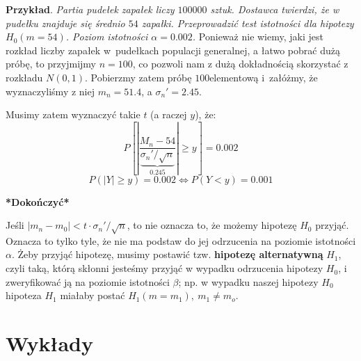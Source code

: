 \documentclass[10pt,a4paper]{article}
\makeatletter
\newcounter{lecture}
\newcommand \listoflectures { \section*{Wykłady} \@starttoc{lol} }
\makeatother
\begin{document}
\textbf{Przykład}. \textit{Partia pudełek zapałek liczy $100000$ sztuk. Dostawca twierdzi, że w pudełku znajduje się średnio $54$ zapałki. Przeprowadzić
 test istotności dla hipotezy $H_0(m=54)$. Poziom istotności $\alpha=0.002$.} Ponieważ nie wiemy, jaki jest rozkład liczby zapałek w~pudełkach
populacji generalnej, a łatwo pobrać dużą próbę, to przyjmijmy $n=100$, co pozwoli nam z dużą dokładnością skorzystać z rozkładu $N(0,1)$. Pobierzmy zatem
 próbę $100$\dywiz elementową i~załóżmy, że wyznaczyliśmy z niej $m_n=51.4$, a ${\sigma_n}'=2.45$.

Musimy zatem wyznaczyć takie $t$ (a raczej $y$), że:
\[ P\left[ \left|\frac{M_n-54}{\underbrace{{\sigma_n}'/\sqrt{n}}_{0.245}}\right|\geq y \right] = 0.002 \]
\[ P(|Y|\geq y) = 0.002 \Longleftrightarrow P(Y<y)=0.001 \]
\begin{center}
 \textbf{*Dokończyć*}
\end{center}
Jeśli $|m_n-m_0|<t\cdot{\sigma_n}'/\sqrt{n}$, to nie oznacza to, że możemy hipotezę $H_0$ przyjąć. Oznacza to tylko tyle, że nie ma podstaw do jej
odrzucenia na poziomie istotności $\alpha$. Żeby przyjąć hipotezę, musimy postawić tzw. \textbf{hipotezę alternatywną} $H_1$, czyli taką, którą
skłonni jesteśmy przyjąć w wypadku odrzucenia hipotezy $H_0$, i zweryfikować ją na poziomie istotności $\beta$; np. w wypadku naszej hipotezy $H_0$
hipoteza $H_1$ miałaby postać $H_1(m=m_1),~m_1 \neq m_o$.
\listoflectures
\end{document}

